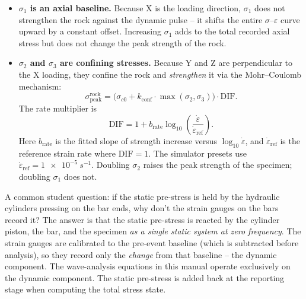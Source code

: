 \documentclass[11pt,a4paper]{article}
\providecommand{\SI}[2]{\qty{#1}{#2}}
\newcommand{\eps}{\varepsilon}
\newcommand{\epsdot}{\dot\eps}
\begin{document}
\begin{itemize}[leftmargin=*, itemsep=4pt]
  \item \textbf{$\sigma_1$ is an axial baseline.} Because X is the loading
        direction, $\sigma_1$ does not strengthen the rock against the dynamic
        pulse -- it shifts the entire $\sigma$--$\eps$ curve upward by a constant
        offset. Increasing $\sigma_1$ adds to the total recorded axial stress
        but does not change the peak strength of the rock.

  \item \textbf{$\sigma_2$ and $\sigma_3$ are confining stresses.} Because Y
        and Z are perpendicular to the X loading, they confine the rock and
        \emph{strengthen} it via the Mohr--Coulomb mechanism:
    \begin{equation}
      \sigma_{\text{peak}}^{\text{rock}}
        = \big(\sigma_{c0} + k_{\text{conf}} \cdot \max(\sigma_2, \sigma_3)\big) \cdot \text{DIF}.
    \end{equation}
        The rate multiplier is
    \begin{equation}
      \text{DIF}=1+b_{\text{rate}}\log_{10}
      \left(\frac{\epsdot}{\epsdot_{\text{ref}}}\right).
    \end{equation}
        Here $b_{\text{rate}}$ is the fitted slope of strength increase versus
        $\log_{10}\epsdot$, and $\epsdot_{\text{ref}}$ is the reference strain
        rate where $\text{DIF}=1$. The simulator presets use
        $\epsdot_{\text{ref}}=\SI{1e-5}{s^{-1}}$.
        Doubling $\sigma_2$ raises the peak strength of the specimen; doubling
        $\sigma_1$ does not.
\end{itemize}

\begin{conceptbox}
A common student question: if the static pre-stress is held by the hydraulic
cylinders pressing on the bar ends, why don't the strain gauges on the bars
record it? The answer is that the static pre-stress is reacted by the cylinder
piston, the bar, and the specimen \emph{as a single static system at zero
frequency}. The strain gauges are calibrated to the pre-event baseline (which
is subtracted before analysis), so they record only the \emph{change} from
that baseline -- the dynamic component. The wave-analysis equations in this
manual operate exclusively on the dynamic component. The static pre-stress is
added back at the reporting stage when computing the total stress state.
\end{conceptbox}
\end{document}

